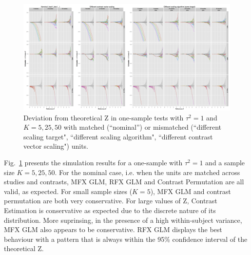 \documentclass[preprint]{elsarticle}
\newcommand{\nStudies}{K}
\newcommand{\varBetween}{\tau^2}
\begin{document}
\begin{figure}[t]
	\centering
 	\includegraphics[width=\linewidth]{./figures/test1_btw1.png}
	\caption{Deviation from theoretical Z in one-sample tests with $\varBetween=1$ and $\nStudies = 5, 25, 50$ with matched (``nominal'') or mismatched (``different scaling target", ``different scaling algorithm", ``different contrast vector scaling") units.}
	\label{test1_k25_btw1}
\end{figure}

Fig.~\ref{test1_k25_btw1} presents the simulation results for a one-sample with $\varBetween=1$ and a sample size $\nStudies = 5, 25, 50$. For the nominal case, i.e. when the units are matched across studies and contrasts, MFX GLM, RFX GLM and Contrast Permutation are all valid, as expected. For small sample sizes ($\nStudies = 5$), MFX GLM and contrast permutation are both very conservative. For large values of Z, Contrast Estimation is conservative as expected due to the discrete nature of its distribution. More suprinsing, in the presence of a high within-subject variance, MFX GLM also appears to be conservative. RFX GLM displays the best behaviour with a pattern that is always within the 95\% confidence interval of the theoretical Z.

\end{document}
